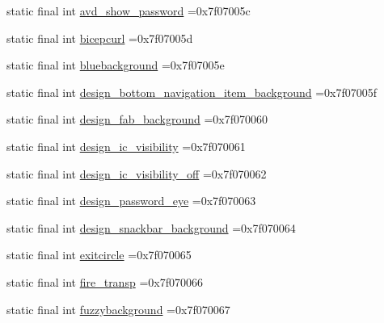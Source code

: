 \begin{DoxyCompactItemize}
\item 
static final int \mbox{\hyperlink{classcom_1_1example_1_1trainawearapplication_1_1_r_1_1drawable_a4b73304b5c3523a8441db3096789ba94}{avd\+\_\+show\+\_\+password}} =0x7f07005c
\item 
static final int \mbox{\hyperlink{classcom_1_1example_1_1trainawearapplication_1_1_r_1_1drawable_a1f79781921ca2b53814d96457681cc7d}{bicepcurl}} =0x7f07005d
\item 
static final int \mbox{\hyperlink{classcom_1_1example_1_1trainawearapplication_1_1_r_1_1drawable_ac795a7bbc04f0e37c0d85ba022992118}{bluebackground}} =0x7f07005e
\item 
static final int \mbox{\hyperlink{classcom_1_1example_1_1trainawearapplication_1_1_r_1_1drawable_a62f5f47a5ef164747fc88bf06947e27d}{design\+\_\+bottom\+\_\+navigation\+\_\+item\+\_\+background}} =0x7f07005f
\item 
static final int \mbox{\hyperlink{classcom_1_1example_1_1trainawearapplication_1_1_r_1_1drawable_ab2ee2fb2a1f4d388dba97ffeda203ab7}{design\+\_\+fab\+\_\+background}} =0x7f070060
\item 
static final int \mbox{\hyperlink{classcom_1_1example_1_1trainawearapplication_1_1_r_1_1drawable_a0c14762f81faff3dc9f1818ca53fc48e}{design\+\_\+ic\+\_\+visibility}} =0x7f070061
\item 
static final int \mbox{\hyperlink{classcom_1_1example_1_1trainawearapplication_1_1_r_1_1drawable_a53d8b4c8801a4fd4965927b75644211c}{design\+\_\+ic\+\_\+visibility\+\_\+off}} =0x7f070062
\item 
static final int \mbox{\hyperlink{classcom_1_1example_1_1trainawearapplication_1_1_r_1_1drawable_a2e4720549de2dc9723aeb55687dd5cfc}{design\+\_\+password\+\_\+eye}} =0x7f070063
\item 
static final int \mbox{\hyperlink{classcom_1_1example_1_1trainawearapplication_1_1_r_1_1drawable_a24bab4d04c2e1433d95235f86042b831}{design\+\_\+snackbar\+\_\+background}} =0x7f070064
\item 
static final int \mbox{\hyperlink{classcom_1_1example_1_1trainawearapplication_1_1_r_1_1drawable_a70205daab4c2b303f0cbbe54d7548354}{exitcircle}} =0x7f070065
\item 
static final int \mbox{\hyperlink{classcom_1_1example_1_1trainawearapplication_1_1_r_1_1drawable_a45aa206472e5208ac27921cf15822cdd}{fire\+\_\+transp}} =0x7f070066
\item 
static final int \mbox{\hyperlink{classcom_1_1example_1_1trainawearapplication_1_1_r_1_1drawable_a4397b3317cacf71d56b072c398e0c918}{fuzzybackground}} =0x7f070067

\end{DoxyCompactItemize}

